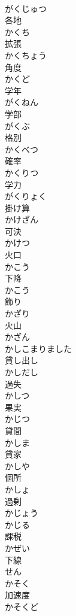 \documentclass[8pt]{extreport}
\begin{document}
\begin{CJK}{UTF8}{min}
\\	がくじゅつ	
\\	各地 
\\	かくち	
\\	拡張 
\\	かくちょう	
\\	角度 
\\	かくど	
\\	学年 
\\	がくねん	
\\	学部 
\\	がくぶ	
\\	格別 
\\	かくべつ	
\\	確率 
\\	かくりつ	
\\	学力 
\\	がくりょく	
\\	掛け算 
\\	かけざん	
\\	可決 
\\	かけつ	
\\	火口 
\\	かこう	
\\	下降 
\\	かこう	
\\	飾り 
\\	かざり	
\\	火山 
\\	かざん	
\\	かしこまりました	
\\	貸し出し 
\\	かしだし	
\\	過失 
\\	かしつ	
\\	果実 
\\	かじつ	
\\	貸間 
\\	かしま	
\\	貸家 
\\	かしや	
\\	個所 
\\	かしょ	
\\	過剰 
\\	かじょう	
\\	かじる	
\\	課税 
\\	かぜい	
\\	下線 
\\	せん	
\\	かそく	
\\	加速度 
\\	かそくど	

\end{CJK}
\end{document}

